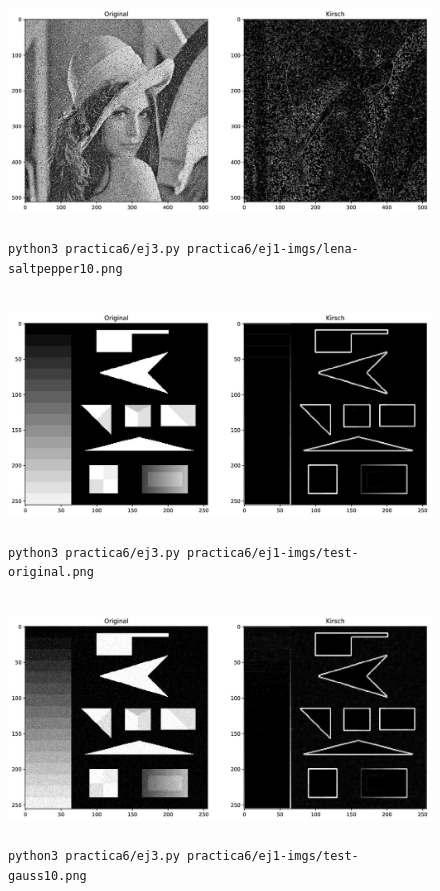 \documentclass[11pt, spanish]{article}
\begin{document}
\begin{figure}[H]
\centering
    \includegraphics[height=6.5cm]{informe-imgs/ej3--lena-saltpepper10.jpg}
    \caption{\texttt{python3 practica6/ej3.py practica6/ej1-imgs/lena-saltpepper10.png }}
\end{figure}


\begin{figure}[H]
\centering
    \includegraphics[height=6.5cm]{informe-imgs/ej3--test-original.jpg}
    \caption{\texttt{python3 practica6/ej3.py practica6/ej1-imgs/test-original.png }}
\end{figure}

\begin{figure}[H]
\centering
    \includegraphics[height=6.5cm]{informe-imgs/ej3--test-gauss10.jpg}
    \caption{\texttt{python3 practica6/ej3.py practica6/ej1-imgs/test-gauss10.png }}
\end{figure}
\end{document}
